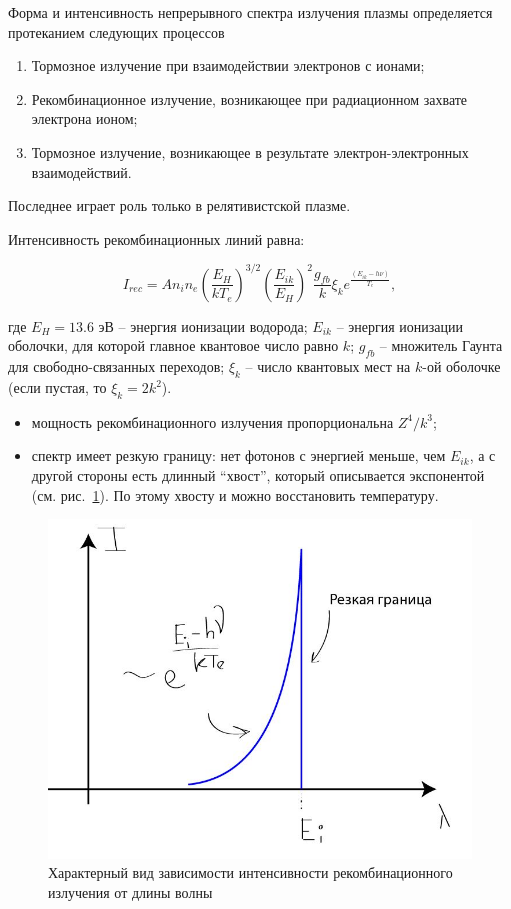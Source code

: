 \documentclass[10pt, a4paper]{article}
\begin{document}
Форма и интенсивность непрерывного спектра излучения плазмы определяется протеканием следующих процессов

\begin{enumerate}
	\item Тормозное излучение при взаимодействии электронов с ионами; 
	\item Рекомбинационное излучение, возникающее при радиационном захвате электрона ионом;
	\item Тормозное излучение, возникающее в результате электрон-электронных взаимодействий.
\end{enumerate}

Последнее играет роль только в релятивистской плазме.

Интенсивность рекомбинационных линий равна:

\begin{equation*}
	I_{rec} = An_in_e \left(\frac{E_H}{kT_e}\right)^{3/2} \left(\frac{E_{ik}}{E_H}\right)^2\frac{g_{fb}}{k} \xi_k e^{\frac{(E_{ik}-h\nu)}{T_e}},
\end{equation*}

где $E_H = 13.6$ эВ -- энергия ионизации водорода; $E_{ik}$ -- энергия ионизации оболочки, для которой главное квантовое число равно $k$; $g_{fb}$ -- множитель Гаунта для свободно-связанных переходов; $\xi_k$ -- число квантовых мест на $k$-ой оболочке (если пустая, то $\xi_k = 2k^2$). 

\begin{itemize}
	\item мощность рекомбинационного излучения пропорциональна $Z^4/k^3$;
	\item спектр имеет резкую границу: нет фотонов с энергией меньше, чем $E_{ik}$, а с другой стороны есть длинный ``хвост'', который описывается экспонентой (см. рис.~\ref{fig:recomb_diagnostics}). По этому хвосту и можно восстановить температуру.
\end{itemize}

\begin{figure}[ht]
	\begin{center}
		\includegraphics[width=0.5\linewidth]{Intencity_recomb.JPG}
	\end{center}
	\caption{Характерный вид зависимости интенсивности рекомбинационного излучения от длины волны}
	\label{fig:recomb_diagnostics}
\end{figure}
\end{document}
